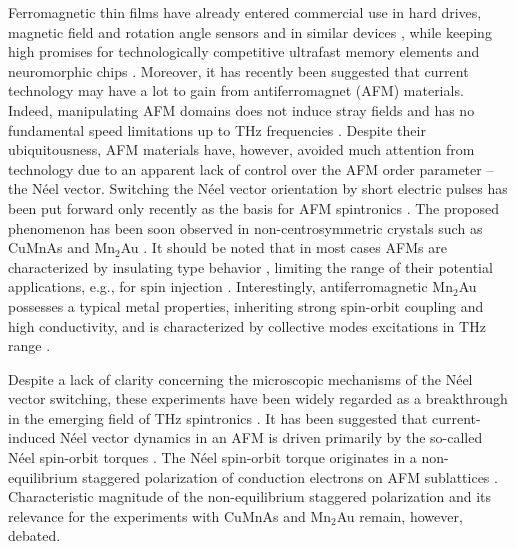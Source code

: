 Ferromagnetic thin films have already entered commercial use in hard drives, magnetic field and rotation angle sensors and in similar devices  \cite{Parkin2003,Jogschies2015,Novoselov2019}, while keeping high promises for technologically competitive ultrafast memory elements \cite{Lau2016} and neuromorphic chips \cite{Fukami2016}. Moreover, it has recently been suggested that current technology may have a lot to gain from antiferromagnet (AFM) materials. Indeed, manipulating AFM domains does not induce stray fields and has no fundamental speed limitations up to THz frequencies \cite{Jungwirth2016AFMreview}. Despite their ubiquitousness, AFM materials have, however, avoided much attention from technology due to an apparent lack of control over the AFM order parameter -- the N\'eel vector. Switching the N\'eel vector orientation by short electric pulses has been put forward only recently as the basis for AFM spintronics \cite{MacDonald2011,Gomonay2014,Zelezny2014}. The proposed phenomenon has been soon observed in non-centrosymmetric crystals such as CuMnAs \cite{Wadley2016, Fina2016, Zelezny2018, Saidl2017} and Mn$_2$Au \cite{Barthem2013, Jordan2015, Bhattacharjee2018}. It should be noted that in most cases AFMs are characterized by insulating type behavior \cite{Pandey2017}, limiting the range of their potential applications, e.g., for spin injection \cite{Tshitoyan2015}. Interestingly, antiferromagnetic Mn$_2$Au possesses a typical metal properties, inheriting strong spin-orbit coupling and high conductivity, and is characterized by collective modes excitations in THz range \cite{Bhattacharjee2018}.

Despite a lack of clarity concerning the microscopic mechanisms of the N\'eel vector switching, these experiments have been widely regarded as a breakthrough in the emerging field of THz spintronics \cite{Bhattacharjee2018, Gomonay2016AFM, Olejnik2018, Jungwirth2018, Wadley2016, Jungwirth2016AFMreview, Baltz2018, Jungwirth2018, Hoffman2018}. It has been suggested that current-induced N\'eel vector dynamics in an AFM is driven primarily by the so-called N\'eel spin-orbit torques \cite{Brataas2012, Hals2013, Zelezny2014, 2014MokrousovSOT, Ghosh2017, SmejkalAFM_2017, Zelezny2018, Zhou2018, Manchon2018, Moriyama2018, Li2019, Chen2019, Zhou2019, Zhou2019a, Bodnar2018}. The N\'eel spin-orbit torque originates in a non-equilibrium staggered polarization of conduction electrons on AFM sublattices \cite{Zelezny2014, SmejkalAFM_2017, Zelezny2018, Manchon2018}. Characteristic magnitude of the non-equilibrium staggered polarization and its relevance for the experiments with CuMnAs and Mn$_2$Au remain, however, debated. 

